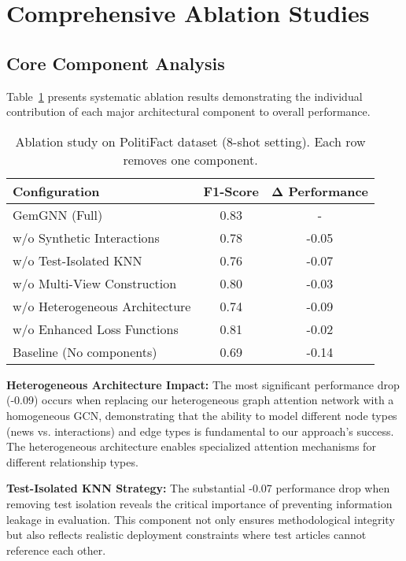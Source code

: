 \section{Comprehensive Ablation Studies}

\subsection{Core Component Analysis}

Table~\ref{tab:ablation:components} presents systematic ablation results demonstrating the individual contribution of each major architectural component to overall performance.

\begin{table}[htbp]
\centering
\caption{Ablation study on PolitiFact dataset (8-shot setting). Each row removes one component.}
\label{tab:ablation:components}
\begin{tabular}{lcc}
\toprule
\textbf{Configuration} & \textbf{F1-Score} & \textbf{Δ Performance} \\
\midrule
GemGNN (Full) & 0.83 & - \\
\midrule
w/o Synthetic Interactions & 0.78 & -0.05 \\
w/o Test-Isolated KNN & 0.76 & -0.07 \\
w/o Multi-View Construction & 0.80 & -0.03 \\
w/o Heterogeneous Architecture & 0.74 & -0.09 \\
w/o Enhanced Loss Functions & 0.81 & -0.02 \\
\midrule
Baseline (No components) & 0.69 & -0.14 \\
\bottomrule
\end{tabular}
\end{table}

\textbf{Heterogeneous Architecture Impact:} The most significant performance drop (-0.09) occurs when replacing our heterogeneous graph attention network with a homogeneous GCN, demonstrating that the ability to model different node types (news vs. interactions) and edge types is fundamental to our approach's success. The heterogeneous architecture enables specialized attention mechanisms for different relationship types.

\textbf{Test-Isolated KNN Strategy:} The substantial -0.07 performance drop when removing test isolation reveals the critical importance of preventing information leakage in evaluation. This component not only ensures methodological integrity but also reflects realistic deployment constraints where test articles cannot reference each other.


